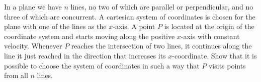 In a plane we have $n$ lines, no two of which are parallel or perpendicular, and no three of which are concurrent. A cartesian system of coordinates is chosen for the plane with one of the lines as the $x$-axis. A point $P$ is located at the origin of the coordinate system and starts moving along the positive $x$-axis with constant velocity. Whenever $P$ reaches the intersection of two lines, it continues along the line it just reached in the direction that increases its $x$-coordinate. Show that it is possible to choose the system of coordinates in such a way that $P$ visits points from all $n$ lines.